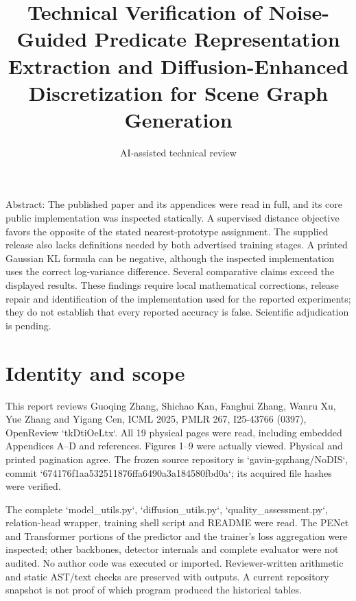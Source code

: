 \documentclass[10pt]{article}
\title{Technical Verification of Noise-Guided Predicate Representation Extraction and Diffusion-Enhanced Discretization for Scene Graph Generation}
\author{AI-assisted technical review}
\date{}
\begin{document}
\maketitle
Abstract: The published paper and its appendices were read in full, and its core public implementation was inspected statically. A supervised distance objective favors the opposite of the stated nearest-prototype assignment. The supplied release also lacks definitions needed by both advertised training stages. A printed Gaussian KL formula can be negative, although the inspected implementation uses the correct log-variance difference. Several comparative claims exceed the displayed results. These findings require local mathematical corrections, release repair and identification of the implementation used for the reported experiments; they do not establish that every reported accuracy is false. Scientific adjudication is pending.\par
\section*{Identity and scope}
This report reviews Guoqing Zhang, Shichao Kan, Fanghui Zhang, Wanru Xu, Yue Zhang and Yigang Cen, ICML 2025, PMLR 267, I25-43766 (0397), OpenReview `tkDtiOeLtx`. All 19 physical pages were read, including embedded Appendices A–D and references. Figures 1–9 were actually viewed. Physical and printed pagination agree. The frozen source repository is `gavin-gqzhang/NoDIS`, commit `674176f1aa532511876ffa6490a3a184580fbd0a`; its acquired file hashes were verified.\par
The complete `model\_utils.py`, `diffusion\_utils.py`, `quality\_assessment.py`, relation-head wrapper, training shell script and README were read. The PENet and Transformer portions of the predictor and the trainer’s loss aggregation were inspected; other backbones, detector internals and complete evaluator were not audited. No author code was executed or imported. Reviewer-written arithmetic and static AST/text checks are preserved with outputs. A current repository snapshot is not proof of which program produced the historical tables.\par
\end{document}
